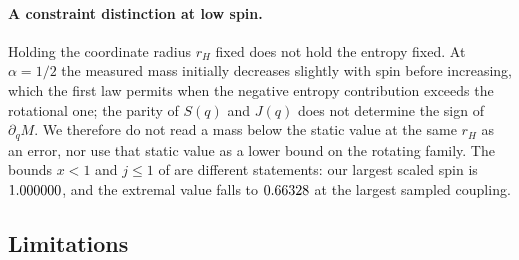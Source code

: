 \documentclass[11pt,a4paper]{article}
\begin{document}
\paragraph{A constraint distinction at low spin.}
Holding the coordinate radius $r_H$ fixed does not hold the entropy fixed. At
$\alpha=1/2$ the measured mass initially decreases slightly with spin before
increasing, which the first law permits when the negative entropy contribution
exceeds the rotational one; the parity of $S(q)$ and $J(q)$ does not determine
the sign of $\partial_qM$. We therefore do not read a mass below the static
value at the same $r_H$ as an error, nor use that static value as a lower bound
on the rotating family. The bounds $x<1$ and $j\le1$ of
\cite{Kleihaus:2023zzs} are different statements: our largest scaled spin is
$1.000000$, and the extremal value falls to $0.66328$ at the largest sampled
coupling.

\subsection{Limitations}
\end{document}
